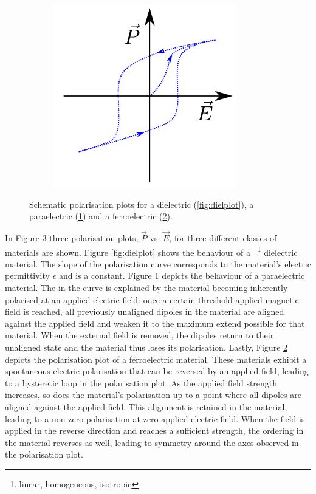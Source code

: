 \begin{figure}
\begin{subfigure}{0.3\textwidth}
	\caption{}
	\label{fig:parelplot}
\end{subfigure}
\begin{subfigure}{0.3\textwidth}
\centering
	\includegraphics[width=0.9\linewidth]{./figs/chap1/ferelpolplot}
	\caption{}
	\label{fig:ferelplot}
\end{subfigure}
\caption{Schematic polarisation plots for a dielectric (\ref{fig:dielplot}), a paraelectric (\ref{fig:parelplot}) and a ferroelectric (\ref{fig:ferelplot}).}
\label{fig:polplot}
\end{figure}
In Figure \ref{fig:polplot} three polarisation plots, $\vec{P}$ vs. $\vec{E}$, for three different classes of materials are shown. Figure \ref{fig:dielplot} shows the behaviour of a ~\footnote{\ie{} linear, homogeneous, isotropic} dielectric material. The slope of the polarisation curve corresponds to the material's electric permittivity $\epsilon$ and is a constant. Figure \ref{fig:parelplot} depicts the behaviour of a paraelectric material. The  in the curve is explained by the material becoming inherently polarised at an applied electric field: once a certain threshold applied magnetic field is reached, all previously unaligned dipoles in the material are aligned against the applied field and weaken it to the maximum extend possible for that material. When the external field is removed, the dipoles return to their unaligned state and the material thus loses its polarisation. Lastly, Figure \ref{fig:ferelplot} depicts the polarisation plot of a ferroelectric material. These materials exhibit a spontaneous electric polarisation that can be reversed by an applied field, leading to a hysteretic loop in the polarisation plot. As the applied field strength increases, so does the material's polarisation up to a point where all dipoles are aligned against the applied field. This alignment is retained in the material, leading to a non-zero polarisation at zero applied electric field. When the field is applied in the reverse direction and reaches a sufficient strength, the ordering in the material reverses as well, leading to symmetry around the axes observed in the polarisation plot.\\
